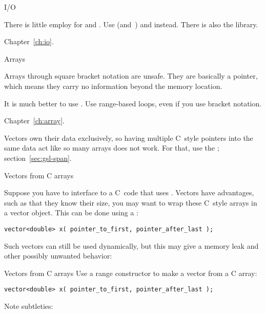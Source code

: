 
 {I/O}

There is little employ for  and
. Use  (and~)
and  instead. There is also the  library.

Chapter~\ref{ch:io}.

 {Arrays}

Arrays through square bracket notation are unsafe. They are basically
a pointer, which means they carry no information beyond the memory location.

It is much better
to use . Use range-based loops, even if you use
bracket notation.

Chapter~\ref{ch:array}.

Vectors own their data exclusively, so having multiple C~style pointers into
the same data act like so many arrays does not work. For that, use the
; section~\ref{sec:gsl-span}.

 {Vectors from C arrays}

Suppose you have to interface to a C~code that uses
.  Vectors have advantages, such as that they know
their size, you may want to wrap these C~style arrays in a vector
object. This can be done using a :
\begin{lstlisting}
vector<double> x( pointer_to_first, pointer_after_last );
\end{lstlisting}

Such vectors can still be used dynamically, but this may give a memory
leak and other possibly unwanted behavior:


\begin{slide}{Vectors from C arrays}
  \label{sl:cvector}
  Use a range constructor to make a vector from a C array:
\begin{lstlisting}
vector<double> x( pointer_to_first, pointer_after_last );
\end{lstlisting}
Note subtleties:
%
\end{slide}

